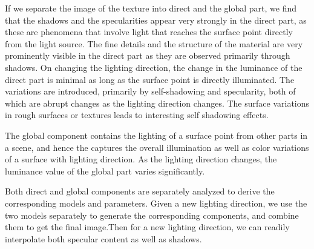 


If we separate the image of the texture into direct and the global part, we find
that the shadows and the specularities appear very strongly in the direct part,
as these are phenomena that involve light that reaches the surface point
directly from the light source. The fine details and the structure of the
material are very prominently visible in the direct part as they are observed
primarily through shadows. On changing the lighting direction, the change in the
luminance of the direct part is minimal as long as the surface point is directly
illuminated. The variations are introduced, primarily by self-shadowing and
specularity, both of which are abrupt changes as the lighting direction changes.
The surface variations in rough surfaces or textures leads to interesting 
self shadowing effects.

The global component contains the lighting of a surface point from other
parts in a scene, and hence the captures the overall illumination as well as
color variations of a surface with lighting direction. As the lighting direction
changes, the luminance value of the global part varies significantly.

Both direct and global components are separately analyzed to derive the
corresponding models and parameters. Given a new lighting direction, we use the
two models separately to generate the corresponding components, and combine them
to get the final image.Then for a new lighting direction, we can readily
interpolate both specular content as well as shadows.
% 

